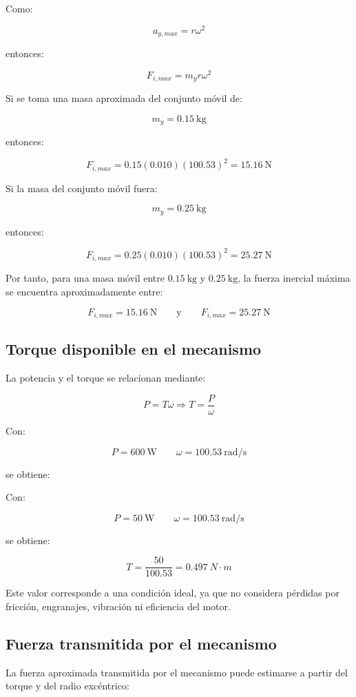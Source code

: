 \documentclass[12pt,letterpaper]{article}
\begin{document}
Como:

\[
a_{y,max}=r\omega^2
\]

entonces:

\[
F_{i,max}=m_y r\omega^2
\]

Si se toma una masa aproximada del conjunto móvil de:

\[
m_y=0.15 \ \text{kg}
\]

entonces:

\[
F_{i,max}=0.15(0.010)(100.53)^2=15.16 \ \text{N}
\]

Si la masa del conjunto móvil fuera:

\[
m_y=0.25 \ \text{kg}
\]

entonces:

\[
F_{i,max}=0.25(0.010)(100.53)^2=25.27 \ \text{N}
\]

Por tanto, para una masa móvil entre \(0.15\ \text{kg}\) y \(0.25\ \text{kg}\), la fuerza inercial máxima se encuentra aproximadamente entre:

\[
F_{i,max}=15.16 \ \text{N}
\qquad \text{y} \qquad
F_{i,max}=25.27 \ \text{N}
\]

\subsection{Torque disponible en el mecanismo}

La potencia y el torque se relacionan mediante:

\[
P=T\omega \Rightarrow T=\frac{P}{\omega}
\]

Con:

\[
P=600 \ \text{W}
\qquad
\omega=100.53 \ \text{rad/s}
\]

se obtiene:

    Con:

\[
P=50 \ \text{W}
\qquad
\omega=100.53 \ \text{rad/s}
\]

se obtiene:

\[
T=\frac{50}{100.53}=0.497\ N\cdot m
\]

Este valor corresponde a una condición ideal, ya que no considera pérdidas por fricción, engranajes, vibración ni eficiencia del motor. 

\subsection{Fuerza transmitida por el mecanismo}

La fuerza aproximada transmitida por el mecanismo puede estimarse a partir del torque y del radio excéntrico:
\end{document}

